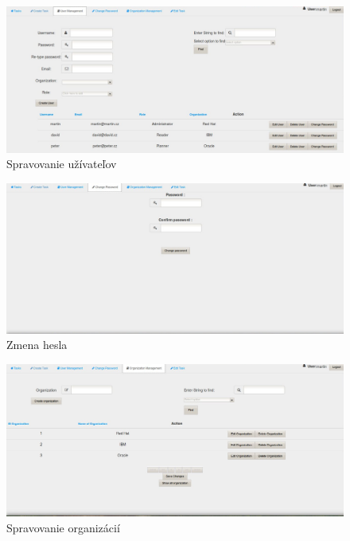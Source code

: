 {\begin{figure}[htb]
\begin{center}
\end{center}

\end{figure}

\begin{figure}[htb]

\begin{center}

\includegraphics[scale=0.5]{page2.jpg} 
\caption{Spravovanie užívateľov}


\end{center}

\end{figure}


\begin{figure}[htb]

\begin{center}

\includegraphics[scale=0.5]{page3.jpg} 
\caption{Zmena hesla}


\end{center}

\end{figure}

\begin{figure}[htb]

\begin{center}

\includegraphics[scale=0.5]{page4.jpg} 
\caption{Spravovanie organizácií}



\end{center}
\end{figure}}
